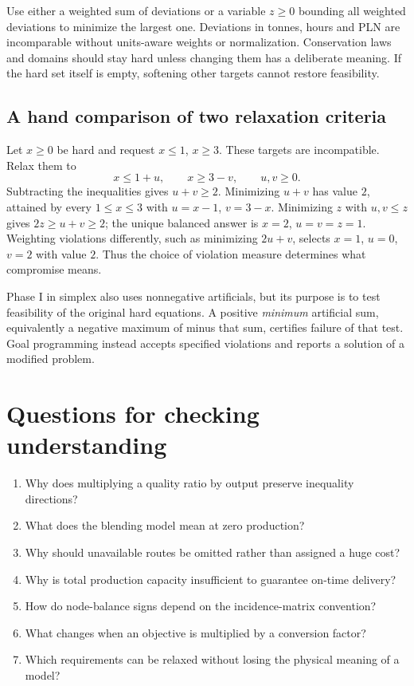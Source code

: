 \documentclass[11pt,a4paper]{article}
\begin{document}
Use either a weighted sum of deviations or a variable $z\geq0$ bounding
all weighted deviations to minimize the largest one. Deviations in tonnes,
hours and PLN are incomparable without units-aware weights or normalization.
Conservation laws and domains should stay hard unless changing them has a
deliberate meaning. If the hard set itself is empty, softening other targets
cannot restore feasibility.

\subsection{A hand comparison of two relaxation criteria}
Let $x\geq0$ be hard and request $x\leq1$, $x\geq3$. These targets are
incompatible. Relax them to
\[
  x\leq1+u,\qquad x\geq3-v,\qquad u,v\geq0.
\]
Subtracting the inequalities gives $u+v\geq2$. Minimizing $u+v$ has value
$2$, attained by every $1\leq x\leq3$ with $u=x-1$, $v=3-x$.
Minimizing $z$ with $u,v\leq z$ gives $2z\geq u+v\geq2$; the unique
balanced answer is $x=2$, $u=v=z=1$. Weighting violations differently,
such as minimizing $2u+v$, selects $x=1$, $u=0$, $v=2$ with value $2$.
Thus the choice of violation measure determines what compromise means.

Phase I in simplex also uses nonnegative artificials, but its purpose is to
test feasibility of the original hard equations. A positive \emph{minimum}
artificial sum, equivalently a negative maximum of minus that sum, certifies
failure of that test. Goal programming instead accepts
specified violations and reports a solution of a modified problem.

\section{Questions for checking understanding}\label{sec:review}
\begin{enumerate}[leftmargin=1.8em]
  \item Why does multiplying a quality ratio by output preserve inequality directions?
  \item What does the blending model mean at zero production?
  \item Why should unavailable routes be omitted rather than assigned a huge cost?
  \item Why is total production capacity insufficient to guarantee on-time delivery?
  \item How do node-balance signs depend on the incidence-matrix convention?
  \item What changes when an objective is multiplied by a conversion factor?
  \item Which requirements can be relaxed without losing the physical meaning of a model?
\end{enumerate}
\end{document}
